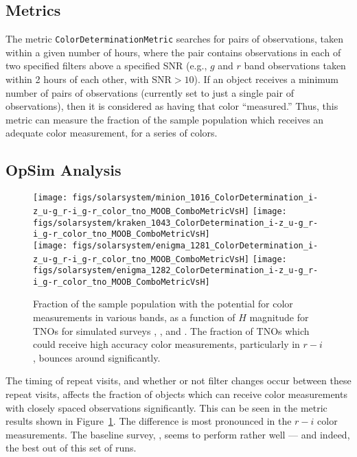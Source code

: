 
\subsection{Metrics}
\label{sec:\secname:metrics}

The metric {\tt ColorDeterminationMetric} searches for pairs of
observations, taken within a given number of hours, where the pair
contains observations in each of two specified filters above a
specified SNR (e.g., $g$ and $r$ band observations taken within 2
hours of each other, with SNR$>10$). If an object receives a minimum
number of pairs of observations (currently set to just a single pair
of observations), then it is considered as having that color
``measured.'' Thus, this metric can measure the fraction of the sample
population which receives an adequate color measurement, for a series
of colors.



\subsection{OpSim Analysis}
\label{sec:\secname:analysis}

\begin{figure}
\texttt{[image: figs/solarsystem/minion\_1016\_ColorDetermination\_i-z\_u-g\_r-i\_g-r\_color\_tno\_MOOB\_ComboMetricVsH]}
\texttt{[image: figs/solarsystem/kraken\_1043\_ColorDetermination\_i-z\_u-g\_r-i\_g-r\_color\_tno\_MOOB\_ComboMetricVsH]}
\\
\texttt{[image: figs/solarsystem/enigma\_1281\_ColorDetermination\_i-z\_u-g\_r-i\_g-r\_color\_tno\_MOOB\_ComboMetricVsH]}
\texttt{[image: figs/solarsystem/enigma\_1282\_ColorDetermination\_i-z\_u-g\_r-i\_g-r\_color\_tno\_MOOB\_ComboMetricVsH]}
\caption{Fraction of the sample population with the potential for
  color measurements in various bands, as a function of $H$ magnitude
  for TNOs for simulated surveys ,
  , 
  and . The fraction of TNOs which
  could receive high accuracy color measurements, particularly in
  $r-i$, bounces around significantly.
\label{colordetermination}}
\end{figure}

The timing of repeat visits, and whether or not filter changes occur
between these repeat visits, affects the fraction of objects which can
receive color measurements with closely spaced observations
significantly. This can be seen in the metric results shown in
Figure~\ref{colordetermination}. The difference is most pronounced in
the $r-i$ color measurements. The baseline survey,
, seems to perform rather well --- and
indeed, the best out of this set of runs.


